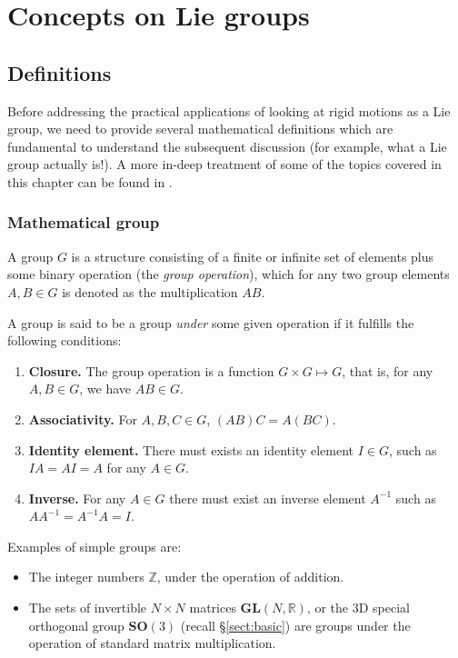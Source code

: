 \documentclass[a4paper,11pt]{report}
\begin{document}
\chapter{Concepts on Lie groups}
\label{chap:lie_intro}

\section{Definitions}
\label{sect:lie_defs}

Before addressing the practical applications of looking at rigid motions 
as a Lie group, 
we need to provide several mathematical definitions which are fundamental 
to understand the subsequent discussion 
(for example, what a Lie group actually is!).
A more in-deep treatment of some of the topics covered in this chapter 
can be found in \cite{gallier2001geometric,varadarajan1974lie}.

\subsection{Mathematical group}
\label{sect:defs:group}

A group $G$ is a structure consisting of a 
finite or infinite set of elements plus
some binary operation (the \emph{group operation}), 
which for any two group elements $A,B \in G$
is denoted as the multiplication $A B$. 

A group is said to be a group \emph{under} some given operation if 
it fulfills the following conditions:
\begin{enumerate}
 \item \textbf{Closure.} The group operation is a function $G \times G \mapsto G$, 
that is, for any $A,B \in G$, we have $A B \in G$.
 \item \textbf{Associativity.} For $A,B,C \in G$, $(AB)C = A(BC)$.
 \item \textbf{Identity element.} There must exists an identity element $I \in G$,
such as $IA=AI=A$ for any $A \in G$.
 \item \textbf{Inverse.} For any $A \in G$ there must exist an inverse element $A^{-1}$
such as $A A^{-1} = A^{-1} A = I$.
\end{enumerate}


Examples of simple groups are:
\begin{itemize}
 \item The integer numbers $\mathbb{Z}$, under the operation of addition. 
 \item The sets of invertible $N \times N$ matrices $\mathbf{GL}(N,\mathbb{R})$, 
or the 3D special orthogonal group $\mathbf{SO}(3)$ (recall \S\ref{sect:basic}) are groups 
under the operation of standard matrix multiplication.
\end{itemize}
\end{document}
